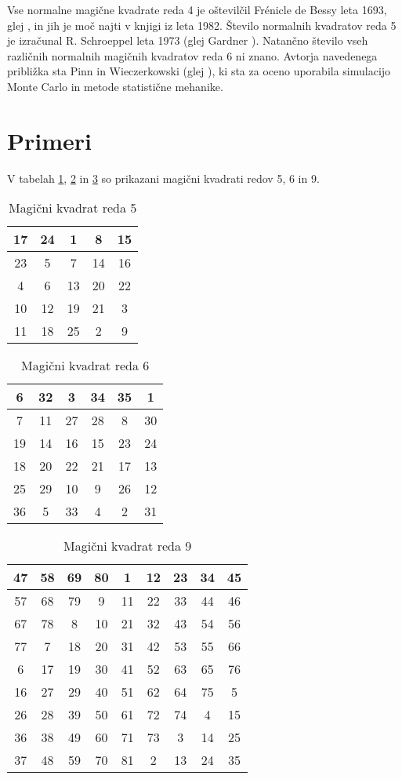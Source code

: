 \documentclass[a4paper,12pt]{article}
\theoremstyle{definition}
\theoremstyle{plain}
\newenvironment{magic}[3]
{
   \begin{table}[!ht]
      \centering
      \caption{#2}
      \label{#3}
      \large
      \begin{tabular}{|*{#1}{c|}}
      \hline
}
{
      \end{tabular}
      \normalsize
   \end{table}
}
\begin{document}
Vse normalne magične kvadrate reda 4 je oštevilčil Frénicle de Bessy
leta 1693, glej \cite{bessy}, in jih je moč najti v knjigi \cite{berlekamp}
iz leta 1982. Število normalnih kvadratov reda 5 je izračunal
R. Schroeppel leta 1973 (glej Gardner \cite{gardner}).
Natančno število vseh različnih normalnih magičnih kvadratov reda 6 ni znano.
Avtorja navedenega približka sta Pinn in Wieczerkowski (glej \cite{pinn}), ki
sta za oceno uporabila simulacijo Monte Carlo in metode statistične mehanike.


\section{Primeri}

V tabelah \ref{table:mag5}, \ref{table:mag6} in \ref{table:mag9} so prikazani
magični kvadrati redov 5, 6 in 9.

\begin{magic}{5}{Magični kvadrat reda 5}{table:mag5}
   17 & 24 &  1 &  8 & 15 \\\hline
   23 &  5 &  7 & 14 & 16 \\\hline
    4 &  6 & 13 & 20 & 22 \\\hline
   10 & 12 & 19 & 21 &  3 \\\hline
   11 & 18 & 25 &  2 &  9 \\\hline
\end{magic}

\begin{magic}{6}{Magični kvadrat reda 6}{table:mag6}
    6 & 32 &  3 & 34 & 35 &  1 \\\hline
    7 & 11 & 27 & 28 &  8 & 30 \\\hline
   19 & 14 & 16 & 15 & 23 & 24 \\\hline
   18 & 20 & 22 & 21 & 17 & 13 \\\hline
   25 & 29 & 10 &  9 & 26 & 12 \\\hline
   36 &  5 & 33 &  4 &  2 & 31 \\\hline
\end{magic}

\begin{magic}{9}{Magični kvadrat reda 9}{table:mag9}
   47 & 58 & 69 & 80 &  1 & 12 & 23 & 34 & 45 \\\hline
   57 & 68 & 79 &  9 & 11 & 22 & 33 & 44 & 46 \\\hline
   67 & 78 &  8 & 10 & 21 & 32 & 43 & 54 & 56 \\\hline
   77 &  7 & 18 & 20 & 31 & 42 & 53 & 55 & 66 \\\hline
    6 & 17 & 19 & 30 & 41 & 52 & 63 & 65 & 76 \\\hline
   16 & 27 & 29 & 40 & 51 & 62 & 64 & 75 &  5 \\\hline
   26 & 28 & 39 & 50 & 61 & 72 & 74 &  4 & 15 \\\hline
   36 & 38 & 49 & 60 & 71 & 73 &  3 & 14 & 25 \\\hline
   37 & 48 & 59 & 70 & 81 &  2 & 13 & 24 & 35 \\\hline
\end{magic}

\newpage




\end{document}
